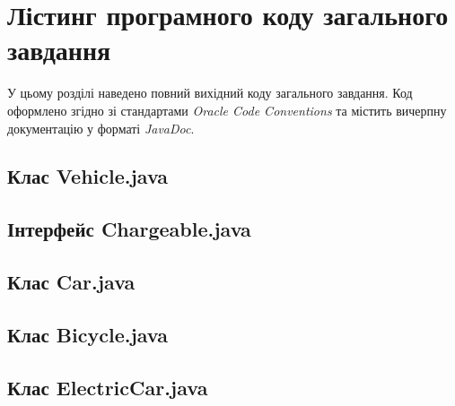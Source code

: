 \section{Лістинг програмного коду загального завдання}

У цьому розділі наведено повний вихідний коду загального завдання. 
Код оформлено згідно зі стандартами \textit{Oracle Code Conventions} та містить 
вичерпну документацію у форматі \textit{JavaDoc}.
\subsection{Клас Vehicle.java}

\newpage %
\subsection{Інтерфейс Chargeable.java}

\newpage %
\subsection{Клас Car.java}

\newpage %
\subsection{Клас Bicycle.java}

\newpage %
\subsection{Клас ElectricCar.java}
